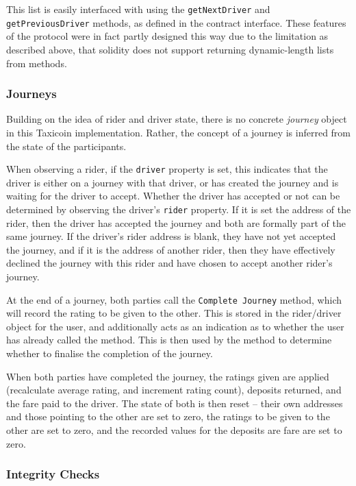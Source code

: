 This list is easily interfaced with using the \lstinline{getNextDriver} and \lstinline{getPreviousDriver} methods, as defined in the contract interface. These features of the protocol were in fact partly designed this way due to the limitation as described above, that solidity does not support returning dynamic-length lists from methods.

\subsubsection{Journeys}

Building on the idea of rider and driver state, there is no concrete \textit{journey} object in this Taxicoin implementation. Rather, the concept of a journey is inferred from the state of the participants.

When observing a rider, if the \lstinline{driver} property is set, this indicates that the driver is either on a journey with that driver, or has created the journey and is waiting for the driver to accept. Whether the driver has accepted or not can be determined by observing the driver's \lstinline{rider} property. If it is set the address of the rider, then the driver has accepted the journey and both are formally part of the same journey. If the driver's rider address is blank, they have not yet accepted the journey, and if it is the address of another rider, then they have effectively declined the journey with this rider and have chosen to accept another rider's journey.

At the end of a journey, both parties call the \lstinline{Complete Journey} method, which will record the rating to be given to the other. This is stored in the rider/driver object for the user, and additionally acts as an indication as to whether the user has already called the method. This is then used by the method to determine whether to finalise the completion of the journey.

When both parties have completed the journey, the ratings given are applied (recalculate average rating, and increment rating count), deposits returned, and the fare paid to the driver. The state of both is then reset -- their own addresses and those pointing to the other are set to zero, the ratings to be given to the other are set to zero, and the recorded values for the deposits are fare are set to zero.

\subsubsection{Integrity Checks}

